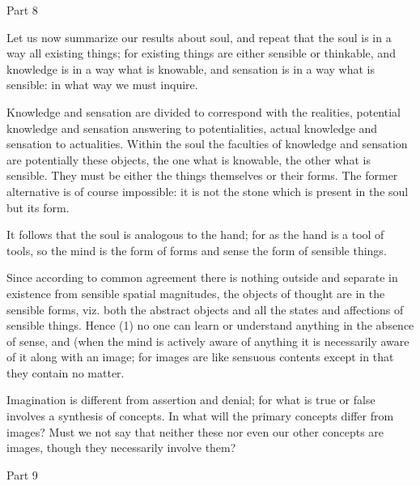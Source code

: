 Part 8

Let us now summarize our results about soul, and repeat that the soul
is in a way all existing things; for existing things are either sensible
or thinkable, and knowledge is in a way what is knowable, and sensation
is in a way what is sensible: in what way we must inquire.

Knowledge and sensation are divided to correspond with the realities,
potential knowledge and sensation answering to potentialities, actual
knowledge and sensation to actualities. Within the soul the faculties
of knowledge and sensation are potentially these objects, the one
what is knowable, the other what is sensible. They must be either
the things themselves or their forms. The former alternative is of
course impossible: it is not the stone which is present in the soul
but its form. 

It follows that the soul is analogous to the hand; for as the hand
is a tool of tools, so the mind is the form of forms and sense the
form of sensible things. 

Since according to common agreement there is nothing outside and separate
in existence from sensible spatial magnitudes, the objects of thought
are in the sensible forms, viz. both the abstract objects and all
the states and affections of sensible things. Hence (1) no one can
learn or understand anything in the absence of sense, and (when the
mind is actively aware of anything it is necessarily aware of it along
with an image; for images are like sensuous contents except in that
they contain no matter. 

Imagination is different from assertion and denial; for what is true
or false involves a synthesis of concepts. In what will the primary
concepts differ from images? Must we not say that neither these nor
even our other concepts are images, though they necessarily involve
them? 

Part 9

